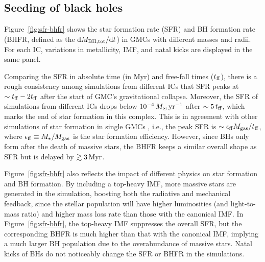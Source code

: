 \documentclass[twocolumn]{aastex631}
\begin{document}
\subsection{Seeding of black holes}

Figure~\ref{fig:sfr-bhfr} shows the star formation rate (SFR) and BH formation rate (BHFR, defined as the $\dd M_{\rm BH,tot}/\dd t$) in GMCs with different masses and radii. For each IC, variations in metallicity, IMF, and natal kicks are displayed in the same panel. 

Comparing the SFR in absolute time (in Myr) and free-fall times ($t_{\rm ff}$), there is a rough consistency among simulations from different ICs that SFR peaks at $\sim t_{\rm ff} - 2 t_{\rm ff}$ after the start of GMC's gravitational collapse. Moreover, the SFR of simulations from different ICs drops below $10^{-4}\,M_\odot\,{\rm yr}^{-1}$ after $\sim 5\,t_{\rm ff}$, which marks the end of star formation in this complex. This is in agreement with other simulations of star formation in single GMCs \citep{GrudicHopkinsFaucher-Giguere_2018MNRAS.475.3511G}, i.e., the peak SFR is $\sim \epsilon_{\rm ff} M_{\rm gas}/t_{\rm ff}$, where $\epsilon_{\rm ff} \equiv M_{\star}/M_{\rm gas}$ is the star formation efficiency. However, since BHs only form after the death of massive stars, the BHFR keeps a similar overall shape as SFR but is delayed by $\gtrsim 3\,\rm Myr$. 

Figure~\ref{fig:sfr-bhfr} also reflects the impact of different physics on star formation and BH formation. By including a top-heavy IMF, more massive stars are generated in the simulation, boosting both the radiative and mechanical feedback, since the stellar population will have higher luminosities (and light-to-mass ratio) and higher mass loss rate \citep{Vink_2023A&A...679L...9V} than those with the canonical IMF. In Figure~\ref{fig:sfr-bhfr}, the top-heavy IMF suppresses the overall SFR, but the corresponding BHFR is much higher than that with the canonical IMF, implying a much larger BH population due to the overabundance of massive stars. Natal kicks of BHs do not noticeably change the SFR or BHFR in the simulations.
\end{document}
